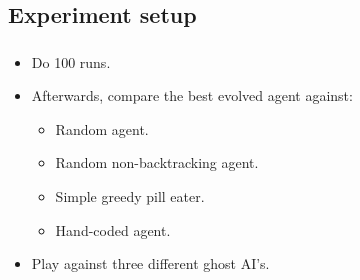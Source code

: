 \documentclass{beamer}
\makeatletter
\newcommand*{\currentname}{\@currentlabelname}
\makeatother
\begin{document}
\subsection{Experiment setup}
\begin{frame}
\frametitle{\currentname}

\begin{itemize}
	\item Do 100 runs.
	\item Afterwards, compare the best evolved agent against:
	\begin{itemize}
		\item Random agent.
		\item Random non-backtracking agent.
		\item Simple greedy pill eater.
		\item Hand-coded agent.
	\end{itemize}
	\item Play against three different ghost AI's.
	
\end{itemize}
\end{frame}
\end{document}
